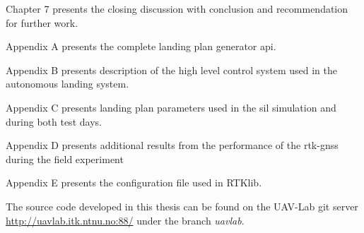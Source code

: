 Chapter 7 presents the closing discussion with conclusion and recommendation for further work.

Appendix A presents the complete landing plan generator \gls{api}.

Appendix B presents description of the high level control system used in the autonomous landing system.

Appendix C presents landing plan parameters used in the \gls{sil} simulation and during both test days.

Appendix D presents additional results from the performance of the \gls{rtk-gnss} during the field experiment

Appendix E presents the configuration file used in RTKlib.

The source code developed in this thesis can be found on the UAV-Lab git server \url{http://uavlab.itk.ntnu.no:88/} under the branch \textit{uavlab}.
\cleardoublepage